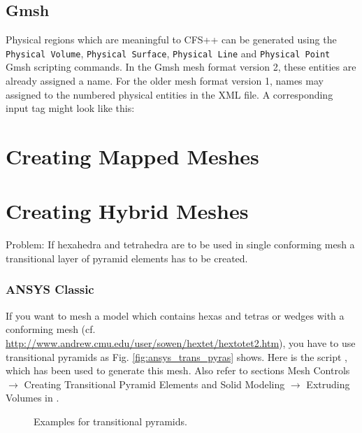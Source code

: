 

\subsection{Gmsh}
\label{sec:define_regions_gmsh}
Physical regions which are meaningful to CFS++ can be generated using the
{\tt Physical Volume}, {\tt Physical Surface}, {\tt Physical Line} and
{\tt Physical Point} Gmsh scripting commands. In the Gmsh mesh format 
version 2, these entities are already assigned a name. For the older
mesh format version 1, names may assigned to the numbered physical
entities in the XML file. A corresponding input tag might look like this:




\section{Creating Mapped Meshes}

\section{Creating Hybrid Meshes}

Problem: If hexahedra and tetrahedra are  to be used in single conforming mesh
a transitional layer of pyramid elements has to be created.

\subsubsection{ANSYS Classic}

If you want to  mesh a model which contains hexas and  tetras or wedges with a
conforming                              mesh                              (cf.
\url{http://www.andrew.cmu.edu/user/sowen/hextet/hextotet2.htm}),  you have to
use transitional pyramids as Fig.  \ref{fig:ansys_trans_pyras} shows.  Here is
the    script    ,    which
has been  used to  generate this  mesh. Also refer  to sections  Mesh Controls
$\rightarrow$  Creating  Transitional  Pyramid  Elements  and  Solid  Modeling
$\rightarrow$ Extruding Volumes in \cite{ANSYSModelMeshGuide2010}.

\begin{figure}[htb] 
  \centering 
  \qquad
  \caption{Examples for transitional pyramids.}
  \label{fig:ansys_pyras}
\end{figure}

